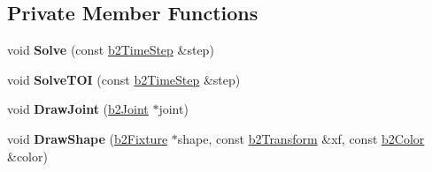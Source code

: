 \subsection*{Private Member Functions}
\begin{DoxyCompactItemize}
\item 
void {\bfseries Solve} (const \hyperlink{structb2_time_step}{b2\+Time\+Step} \&step)\hypertarget{classb2_world_a6cac2e86197dd42f05ed135e7bea41e0}{}\label{classb2_world_a6cac2e86197dd42f05ed135e7bea41e0}

\item 
void {\bfseries Solve\+T\+OI} (const \hyperlink{structb2_time_step}{b2\+Time\+Step} \&step)\hypertarget{classb2_world_ae9524ce16eb46732d15df9148e715e0e}{}\label{classb2_world_ae9524ce16eb46732d15df9148e715e0e}

\item 
void {\bfseries Draw\+Joint} (\hyperlink{classb2_joint}{b2\+Joint} $\ast$joint)\hypertarget{classb2_world_af3d7aaf71b4cbb99760a7cd2f2ba43d7}{}\label{classb2_world_af3d7aaf71b4cbb99760a7cd2f2ba43d7}

\item 
void {\bfseries Draw\+Shape} (\hyperlink{classb2_fixture}{b2\+Fixture} $\ast$shape, const \hyperlink{structb2_transform}{b2\+Transform} \&xf, const \hyperlink{structb2_color}{b2\+Color} \&color)\hypertarget{classb2_world_ac013bf7fbe36cda452a707ea62a46c39}{}\label{classb2_world_ac013bf7fbe36cda452a707ea62a46c39}

\end{DoxyCompactItemize}
